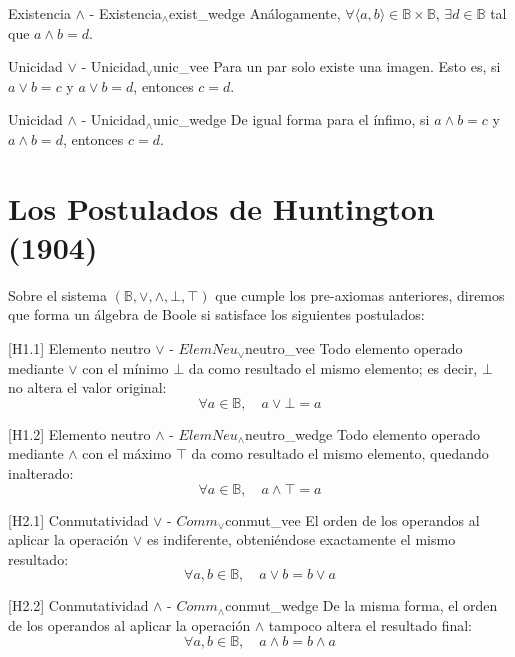 \begin{preaxioma}{Existencia $\wedge$ - Existencia$_\wedge$}{exist_wedge}
Análogamente, $\forall \langle a,b \rangle \in \mathbb{B} \times \mathbb{B}$, $\exists d \in \mathbb{B}$ tal que $a \wedge b = d$.
\end{preaxioma}

\begin{preaxioma}{Unicidad $\vee$ - Unicidad$_\vee$}{unic_vee}
Para un par solo existe una imagen. Esto es, si $a \vee b = c$ y $a \vee b = d$, entonces $c = d$.
\end{preaxioma}

\begin{preaxioma}{Unicidad $\wedge$ - Unicidad$_\wedge$}{unic_wedge}
De igual forma para el ínfimo, si $a \wedge b = c$ y $a \wedge b = d$, entonces $c = d$.
\end{preaxioma}

\section{Los Postulados de Huntington (1904)}
Sobre el sistema $(\mathbb{B}, \vee, \wedge, \bot, \top)$ que cumple los pre-axiomas anteriores, diremos que forma un álgebra de Boole si satisface los siguientes postulados:

\begin{postulado}{[H1.1] Elemento neutro $\vee$ - $ElemNeu_\vee$}{neutro_vee}
Todo elemento operado mediante $\vee$ con el mínimo $\bot$ da como resultado el mismo elemento; es decir, $\bot$ no altera el valor original:
\[ \forall a \in \mathbb{B}, \quad a \vee \bot = a \]
\end{postulado}

\begin{postulado}{[H1.2] Elemento neutro $\wedge$ - $ElemNeu_\wedge$}{neutro_wedge}
Todo elemento operado mediante $\wedge$ con el máximo $\top$ da como resultado el mismo elemento, quedando inalterado:
\[ \forall a \in \mathbb{B}, \quad a \wedge \top = a \]
\end{postulado}

\begin{postulado}{[H2.1] Conmutatividad $\vee$ - $Comm_\vee$}{conmut_vee}
El orden de los operandos al aplicar la operación $\vee$ es indiferente, obteniéndose exactamente el mismo resultado:
\[ \forall a, b \in \mathbb{B}, \quad a \vee b = b \vee a \]
\end{postulado}

\begin{postulado}{[H2.2] Conmutatividad $\wedge$ - $Comm_\wedge$}{conmut_wedge}
De la misma forma, el orden de los operandos al aplicar la operación $\wedge$ tampoco altera el resultado final:
\[ \forall a, b \in \mathbb{B}, \quad a \wedge b = b \wedge a \]
\end{postulado}

